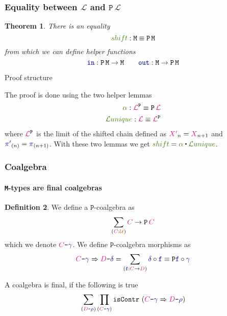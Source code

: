 \documentclass[xelatex,mathserif,serif,notheorems]{beamer} %
\theoremstyle{plain} %
\newtheorem{thm}{Theorem}[section]
\theoremstyle{definition}
\newtheorem{defn}[thm]{Definition}%
\theoremstyle{remark}
\newcommand*{\pathterm}[1]{\textcolor{green!65!red!75!black}{#1}}
\newcommand*{\type}[1]{\textcolor{magenta!90!black}{#1}}
\newcommand*{\universe}[1]{\textcolor{orange!80!black}{#1}}
\newcommand*{\coalg}[2]{#1\texttt{-}#2}
\newcommand*{\function}[1]{\textcolor{blue!60!black}{\ensuremath{\mathtt{#1}}}}
\newcommand*{\typeformer}[1]{\ensuremath{\mathtt{#1}}}
\newcommand*{\functor}[1]{\ensuremath{\mathbf{\mathtt{#1}}}}
\newcommand{\ct}{%
  \mathchoice{\mathbin{\raisebox{0.5ex}{$\displaystyle\centerdot$}}}%
  {\mathbin{\raisebox{0.5ex}{$\centerdot$}}}%
  {\mathbin{\raisebox{0.25ex}{$\scriptstyle\,\centerdot\,$}}}%
  {\mathbin{\raisebox{0.1ex}{$\scriptscriptstyle\,\centerdot\,$}}}
}
\newcommand{\setlengths}{
  \setlength{\abovedisplayskip}{4pt}
  \setlength{\belowdisplayskip}{4pt}
  \setlength{\abovedisplayshortskip}{2pt}
  \setlength{\belowdisplayshortskip}{2pt}
}
\begin{document}
\begin{frame}
  \frametitle{Equality between \(\mathcal{L}\) and \(\functor{P}\,\mathcal{L}\)}
  \begin{thm}\setlengths
    There is an equality
    \begin{equation}
      \pathterm{shift} : \typeformer{M} \equiv \functor{P}\,\typeformer{M}
    \end{equation}
    from which we can define helper functions
    \begin{equation}
      \function{in} : \functor{P}\,\typeformer{M} \rightarrow \typeformer{M} \qquad \function{out} : \typeformer{M} \rightarrow \functor{P}\,\typeformer{M}
    \end{equation}    
  \end{thm}
  \begin{block}{Proof structure}\setlengths
    The proof is done using the two helper lemmas
    \begin{align}
      \pathterm{\alpha} : \type{\mathcal{L}}^{\functor{P}} \equiv \functor{P}\,\type{\mathcal{L}} \\
      \pathterm{\mathcal{L}unique} : \type{\mathcal{L}} \equiv \type{\mathcal{L}}^{\functor{P}}
    \end{align}
    where \(\type{\mathcal{L}}^{\functor{P}}\) is the limit of the shifted chain defined as \(\type{X'}_n = \type{X}_{n+1}\) and \(\function{\pi'}_{(n)} = \function{\pi}_{(n+1)}\). With these two lemmas we get \(\pathterm{shift} = \pathterm{\alpha} \ct \pathterm{\mathcal{L}unique}\).
  \end{block}
\end{frame}

\begin{frame}
  \frametitle{Coalgebra}
  \framesubtitle{\texttt{M}-types are final coalgebras}
  \begin{defn}\setlengths
    We define a \(\functor{P}\)-coalgebra as
    \begin{equation}
      \sum_{(\type{C} : \universe{\mathcal{U}})} \type{C} \rightarrow \functor{P}\,\type{C}
    \end{equation}
    which we denote \(\coalg{\type{C}}{\function{\gamma}}\). We define \(\functor{P}\)-coalgebra morphisms as
    \begin{equation}
      \coalg{\type{C}}{\function{\gamma}} \Rightarrow \coalg{\type{D}}{\function{\delta}} = \sum_{(\function{f} : \type{C} \rightarrow \type{D})} \function{\delta} \circ \function{f} \equiv \functor{P} \function{f} \circ \function{\gamma}
    \end{equation}
  \end{defn}
  A coalgebra is final, if the following is true
  \begin{equation}
    \sum_{(\coalg{\type{D}}{\function{\rho}})}\prod_{(\coalg{\type{C}}{\function{\gamma}})} \mathtt{isContr}~(\coalg{\type{C}}{\function{\gamma}} \Rightarrow \coalg{\type{D}}{\function{\rho}})    
  \end{equation}
\end{frame}
\end{document}
